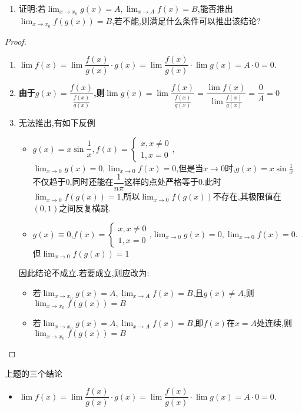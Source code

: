 \documentclass[8pt a4paper, oneside, UTF8]{ctexbook}
\begin{document}
\begin{sloppypar}
\begin{problem}
\begin{enumerate}
            \item 证明:若$\lim_{x \to x_0}g(x)=A,\lim_{x \to A}f(x)=B$,能否推出$\lim_{x\to x_0}f(g(x))=B$,若不能,则满足什么条件可以推出该结论?
        \end{enumerate}
    \end{problem}
    \begin{proof}
        \begin{enumerate}
            \item $\lim f(x)=\lim\dfrac{f(x)}{g(x)}\cdot g(x)=\lim\dfrac{f(x)}{g(x)}\cdot\lim g(x)=A\cdot0=0.$
            \item \textbf{由于$g(x)=\dfrac{f(x)}{\frac{f(x)}{g(x)}}$,则$\lim g(x)=\lim\dfrac{f(x)}{\frac{f(x)}{g(x)}}=\dfrac{\lim f(x)}{\lim\frac{f(x)}{g(x)}}=\dfrac{0}{A}=0$}
            \item 无法推出,有如下反例
            \begin{itemize}
                \item $g(x)=x \sin \dfrac{1}{x},f(x)=\begin{cases} x,x \neq 0\\1,x=0 \end{cases}$,$\lim_{x \to 0}g(x)=0,\lim_{x\to0}f(x)=0$,但是当$x \to 0$时,$g(x)=x\sin \frac{1}{x}$不仅趋于0,同时还能在$\dfrac{1}{n \pi}$这样的点处严格等于0.此时$\lim_{x \to 0}f(g(x))=1$,所以$\lim_{x\to 0}f(g(x))$不存在,其极限值在$(0,1)$之间反复横跳.
                \item $g(x) \equiv 0$,$f(x)=\begin{cases} x,x \neq 0\\ 1,x=0 \end{cases}$,$\lim_{x\to 0}g(x)=0,\lim_{x\to 0}f(x)=0.$但$\lim_{x\to 0}f(g(x))=1$
            \end{itemize}
            因此结论不成立.若要成立,则应改为:
            \begin{itemize}
                \item 若$\lim_{x \to x_0}g(x)=A,\lim_{x\to A}f(x)=B$,且$g(x)\neq A$,则$\lim_{x\to x_0}f(g(x))=B$
                \item 若$\lim_{x \to x_0}g(x)=A,\lim_{x\to A}f(x)=B$,即$f(x)$在$x=A$处连续,则$\lim_{x\to x_0}f(g(x))=B$
            \end{itemize}
        \end{enumerate}
    \end{proof}
    \begin{conclusion}{上题的三个结论}{}
        \begin{itemize}
            \item $\lim f(x)=\lim\dfrac{f(x)}{g(x)}\cdot g(x)=\lim\dfrac{f(x)}{g(x)}\cdot\lim g(x)=A\cdot0=0.$

\end{itemize}
\end{conclusion}
\end{sloppypar}
\end{document}
